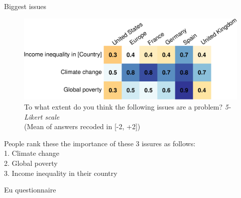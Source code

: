 \documentclass[aspectratio=169,xcolor=dvipsnames, 11pt,mathserif]{beamer}
\begin{document}
\begin{frame}{Biggest issues \hyperlink{donation}{}\label{problems}}
    \begin{figure}
        \centering 
        \caption{To what extent do you think the following issues are a problem? \textit{5-Likert scale} \\(Mean of answers recoded in [-2, +2])
        }
        \vspace{-.2cm}
        \includegraphics[width=.7\textwidth]{../figures/country_comparison/problem_mean.pdf} 
    \end{figure}
	\bbvs \ip People rank these the importance of these 3 issures as follows: \\ 1. Climate change \\ 2. Global poverty \\ 3. Income inequality in their country
    \ee
\end{frame}

\begin{frame}{Eu questionnaire \hyperlink{questionnaires}{}\label{survey_flow}}
    \vspace{.05cm}
\end{frame}
\end{document}
